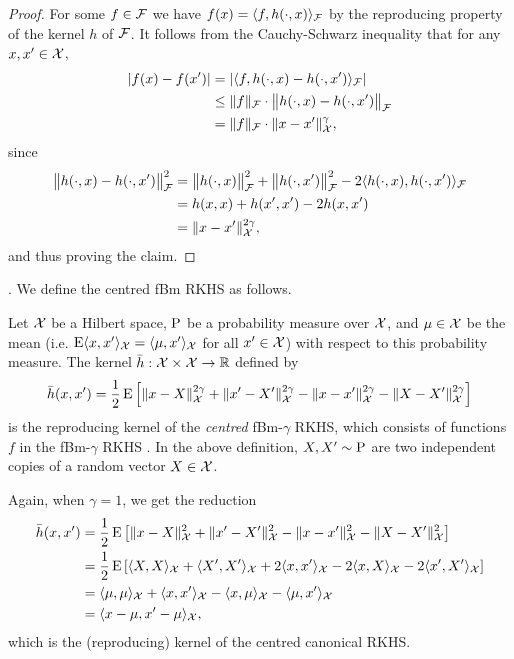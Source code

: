 \documentclass[a4paper,showframe,11pt,draft]{report}
\begin{document}
\begin{proof}
  For some $f \in {\mathcal F}$ we have $f(x) = \langle f,h(\cdot,x)\rangle_{\mathcal F}$ by the reproducing property of the kernel $h$ of ${\mathcal F}$.
  It follows from the Cauchy-Schwarz inequality that for any $x,x'\in{\mathcal X}$,
  \begin{align*}
    \vert f(x) - f(x') \vert 
    &= \vert \langle f,h(\cdot,x) - h(\cdot,x')\rangle_{\mathcal F} \vert \\
    &\leq \lVert f\rVert_{\mathcal F} \cdot \big\Vert h(\cdot,x) - h(\cdot,x') \big\Vert_{\mathcal F} \\
    &= \lVert f\rVert_{\mathcal F} \cdot \lVert x-x'\rVert_{\mathcal X}^{\gamma},
  \end{align*}
  since
  \begin{align*}
    \big\Vert h(\cdot,x) - h(\cdot,x') \big\Vert_{\mathcal F} ^2
    &= \big\Vert h(\cdot,x) \big\Vert_{\mathcal F} ^2 + \big\Vert h(\cdot,x') \big\Vert_{\mathcal F} ^2 - 2 \langle h(\cdot,x),h(\cdot,x')\rangle_{\mathcal F} \\
    &= h(x,x) + h(x',x') - 2 h(x,x') \\
    &= \lVert x-x'\rVert_{\mathcal X}^{2\gamma},
  \end{align*}  
  and thus proving the claim.
\end{proof}

.
We define the centred fBm RKHS as follows.

\begin{definition}
  Let ${\mathcal X}$ be a Hilbert space, $\operatorname{P}$ be a probability measure over ${\mathcal X}$, and $\mu\in{\mathcal X}$ be the mean (i.e. $\operatorname{E}\langle x,x'\rangle_{{\mathcal X}}  = \langle\mu,x'\rangle_{{\mathcal X}}$ for all $x' \in {\mathcal X}$) with respect to this probability measure.
  The kernel $\bar h:{\mathcal X}\times{\mathcal X}\to\mathbb{R}$ defined by
  \[
    \bar h(x,x') = \frac{1}{2} \operatorname{E} \left[ \lVert x-X\rVert_{\mathcal X}^{2\gamma} + \lVert x'-X'\rVert_{\mathcal X}^{2\gamma} - \lVert x-x'\rVert_{\mathcal X}^{2\gamma} - \lVert X-X'\rVert_{\mathcal X}^{2\gamma} \right]
  \]
  is the reproducing kernel of the \emph{centred} fBm-$\gamma$ RKHS, which consists of functions $f$ in the fBm-$\gamma$ RKHS .
  In the above definition, $X,X' \sim \operatorname{P}$ are two independent copies of a random vector $X \in {\mathcal X}$.
\end{definition}

\begin{remark}
  Again, when $\gamma=1$, we get the reduction 
  \begin{align*}
    \bar h(x,x') 
    &= \frac{1}{2} \operatorname{E} \left[ \lVert x-X\rVert_{\mathcal X}^{2} + \lVert x'-X'\rVert_{\mathcal X}^{2} - \lVert x-x'\rVert_{\mathcal X}^{2} - \lVert X-X'\rVert_{\mathcal X}^{2} \right] \\
    &= \frac{1}{2} \operatorname{E} \left[ \langle X,X\rangle_{\mathcal X} + \langle X',X'\rangle_{\mathcal X} + 2\langle x,x'\rangle_{\mathcal X} - 2\langle x,X\rangle_{\mathcal X} - 2\langle x',X'\rangle_{\mathcal X}\right] \\
    &= \langle\mu,\mu\rangle_{\mathcal X} + \langle x,x'\rangle_{\mathcal X} - \langle x,\mu\rangle_{\mathcal X} - \langle\mu,x'\rangle_{\mathcal X} \\
    &= \langle x-\mu,x'-\mu\rangle_{\mathcal X},
  \end{align*}
  which is the (reproducing) kernel of the centred canonical RKHS.
\end{remark}
\end{document}
